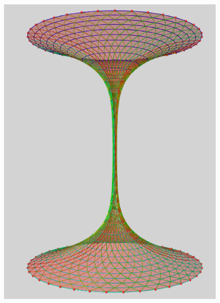 \documentclass{beamer}
\begin{document}
\begin{frame}
{\begin{figure}[h!]
      \includegraphics[scale=0.25]{8.eps}
\end{figure}
}
\end{frame}
\end{document}
